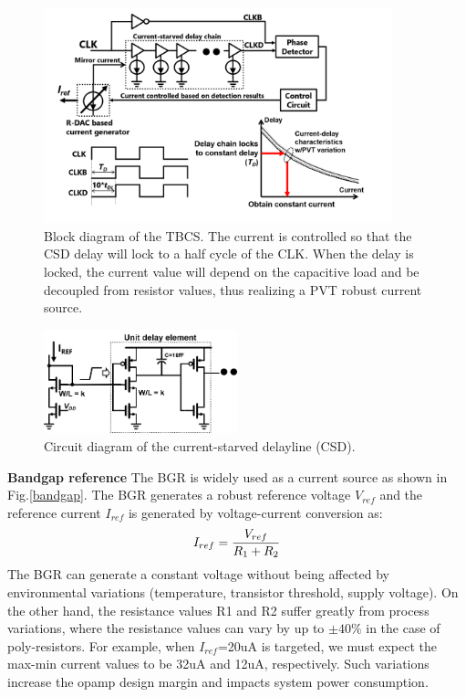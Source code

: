 \documentclass[paper]{ieice}
\begin{document}
\begin{figure}[!t]
\centering
 \includegraphics[width=0.9\textwidth]{figs/fig2.png}
  \caption{Block diagram of the TBCS. The current is controlled so that the CSD delay will lock to a half cycle of the CLK. When the delay is locked, the current value will depend on the capacitive load and be decoupled from resistor values, thus realizing a PVT robust current source.}
  \label{fig2}
\end{figure}

\begin{figure}[!t]
\centering
 \includegraphics[width=0.5\textwidth]{figs/inv.png}
  \caption{Circuit diagram of the current-starved delayline (CSD).}
\label{inv}
\end{figure}

\textbf{Bandgap reference} The BGR is widely used as a current source as shown in Fig.\ref{bandgap}. The BGR generates a robust reference voltage $V_{ref}$ and the reference current $I_{ref}$ is generated by voltage-current conversion as:
\begin{eqnarray}
    \centering
    I_{ref} = \frac{V_{ref}}{R_1 + R_2}
    \label{sar13b}
\end{eqnarray}
The BGR can generate a constant voltage without being affected by environmental variations (temperature, transistor threshold, supply voltage). On the other hand, the resistance values R1 and R2 suffer greatly from process variations, where the resistance values can vary by up to $\pm 40\%$ in the case of poly-resistors. For example, when $I_{ref}$=20uA is targeted, we must expect the max-min current values to be 32uA and 12uA, respectively. Such variations increase the opamp design margin and impacts system power consumption.
\end{document}
